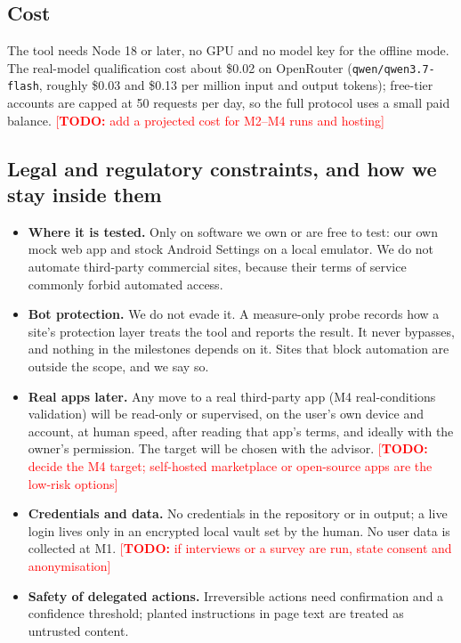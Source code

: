 \documentclass[11pt,a4paper]{article}
\newcommand{\todo}[1]{\textcolor{red}{[\textbf{TODO:} #1]}}
\begin{document}
\subsection{Cost}
The tool needs Node 18 or later, no GPU and no model key for the offline mode. The real-model qualification cost about \$0.02 on OpenRouter (\texttt{qwen/qwen3.7-flash}, roughly \$0.03 and \$0.13 per million input and output tokens); free-tier accounts are capped at 50 requests per day, so the full protocol uses a small paid balance. \todo{add a projected cost for M2--M4 runs and hosting}

\subsection{Legal and regulatory constraints, and how we stay inside them}
\begin{itemize}
\item \textbf{Where it is tested.} Only on software we own or are free to test: our own mock web app and stock Android Settings on a local emulator. We do not automate third-party commercial sites, because their terms of service commonly forbid automated access.
\item \textbf{Bot protection.} We do not evade it. A measure-only probe records how a site's protection layer treats the tool and reports the result. It never bypasses, and nothing in the milestones depends on it. Sites that block automation are outside the scope, and we say so.
\item \textbf{Real apps later.} Any move to a real third-party app (M4 real-conditions validation) will be read-only or supervised, on the user's own device and account, at human speed, after reading that app's terms, and ideally with the owner's permission. The target will be chosen with the advisor. \todo{decide the M4 target; self-hosted marketplace or open-source apps are the low-risk options}
\item \textbf{Credentials and data.} No credentials in the repository or in output; a live login lives only in an encrypted local vault set by the human. No user data is collected at M1. \todo{if interviews or a survey are run, state consent and anonymisation}
\item \textbf{Safety of delegated actions.} Irreversible actions need confirmation and a confidence threshold; planted instructions in page text are treated as untrusted content.
\end{itemize}

\end{document}
